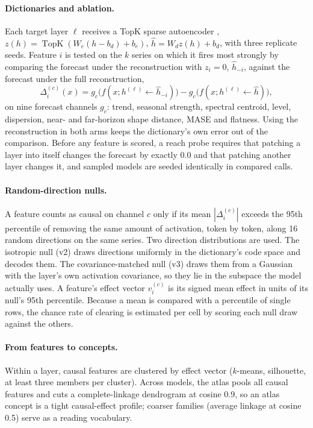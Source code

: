 \paragraph{Dictionaries and ablation.} Each target layer $\ell$ receives a TopK sparse autoencoder
\citep{makhzani2013ksparse,gao2025topk}, $z(h)=\operatorname{TopK}(W_e(h-b_d)+b_e)$, $\hat h=W_dz(h)+b_d$, with three
replicate seeds. Feature $i$ is tested on the $k$ series on which it fires most strongly by comparing the forecast under
the reconstruction with $z_i=0$, $\hat h_{-i}$, against the forecast under the full reconstruction,
\begin{equation}
  \Delta_i^{(c)}(x) = g_c\big(f(x;h^{(\ell)}\!\leftarrow\!\hat h_{-i})\big) - g_c\big(f(x;h^{(\ell)}\!\leftarrow\!\hat h)\big),
  \label{eq:ablation}
\end{equation}
on nine forecast channels $g_c$: trend, seasonal strength, spectral centroid, level, dispersion, near- and
far-horizon shape distance, MASE and flatness. Using the reconstruction in both arms keeps the dictionary's own error
out of the comparison. Before any feature is scored, a reach probe requires that patching a layer into itself changes
the forecast by exactly 0.0 and that patching another layer changes it, and sampled models are seeded identically in
compared calls.

\paragraph{Random-direction nulls.} A feature counts as causal on channel $c$ only if its mean $|\Delta_i^{(c)}|$ exceeds
the 95th percentile of removing the same amount of activation, token by token, along 16 random directions on the
same series. Two direction distributions are used. The isotropic null (v2) draws directions uniformly in the
dictionary's code space and decodes them. The covariance-matched null (v3) draws them from a Gaussian with the
layer's own activation covariance, so they lie in the subspace the model actually uses. A feature's effect vector
$v_i^{(c)}$ is its signed mean effect in units of its null's 95th percentile. Because a mean is compared with a
percentile of single rows, the chance rate of clearing is estimated per cell by scoring each null draw against the
others.

\paragraph{From features to concepts.} Within a layer, causal features are clustered by effect vector ($k$-means,
silhouette, at least three members per cluster). Across models, the atlas pools all causal features and cuts a
complete-linkage dendrogram at cosine 0.9, so an atlas concept is a tight causal-effect profile; coarser families
(average linkage at cosine 0.5) serve as a reading vocabulary.

